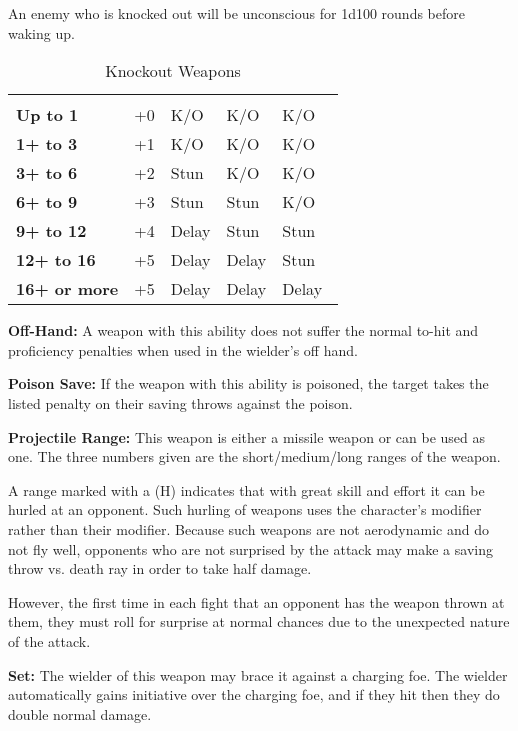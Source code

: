 \begin{multicols*}{2}
An enemy who is knocked out will be unconscious for 1d100 rounds before waking up.

\begin {table}[H]
  \caption{Knockout Weapons}\label{tab:Knockout Weapons}
	\begin{tabularx}{\columnwidth}{>{\bfseries}M{.6in}YYYY}
		 &  &  &  & \\
		Up to 1 & +0 & K/O & K/O & K/O\\
		1+ to 3 & +1 & K/O & K/O & K/O\\
		3+ to 6 & +2 & Stun & K/O & K/O\\
		6+ to 9 & +3 & Stun & Stun & K/O\\
		9+ to 12 & +4 & Delay & Stun & Stun\\
		12+ to 16 & +5 & Delay & Delay & Stun\\
		16+ or more & +5 & Delay & Delay & Delay\
  \end {tabularx}
\end {table}

\textbf{Off-Hand:} A weapon with this ability does not suffer the normal to-hit and proficiency penalties when used in the wielder’s off hand.

\textbf{Poison Save:} If the weapon with this ability is poisoned, the target takes the listed penalty on their saving throws against the poison.

\textbf{Projectile Range:} This weapon is either a missile weapon or can be used as one. The three numbers given are the short/medium/long ranges of the weapon.

A range marked with a (H) indicates that with great skill and effort it can be hurled at an opponent. Such hurling of weapons uses the character’s  modifier rather than their  modifier. Because such weapons are not aerodynamic and do not fly well, opponents who are not surprised by the attack may make a saving throw vs. death ray in order to take half damage.

However, the first time in each fight that an opponent has the weapon thrown at them, they must roll for surprise at normal chances due to the unexpected nature of the attack.

\textbf{Set:} The wielder of this weapon may brace it against a charging foe. The wielder automatically gains initiative over the charging foe, and if they hit then they do double normal damage.


\end{multicols*}
